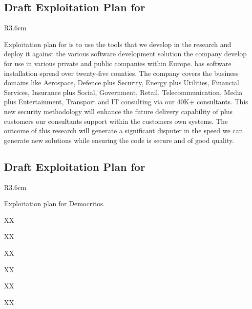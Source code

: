 \documentclass[a4paper,11pt]{article}
\begin{document}
\subsection*{Draft Exploitation Plan for \SOPRAshort{}}
\vspace{-6pt}

\begin{wrapfigure}{R}{3.6cm}
\vspace{-1.3cm}
\hfill {}
\vspace{-0.8cm}
\end{wrapfigure}

Exploitation plan for \SOPRAlong{} is to use the tools that we develop in the research and deploy it against the various software development solution the company develop for use in various private and public companies within Europe. \SOPRAshort{} has software installation spread over twenty-five counties. The company covers the business domains like Aerospace, Defence plus Security, Energy plus Utilities, Financial Services, Insurance plus Social, Government, Retail, Telecommunication, Media plus Entertainment, Transport and IT consulting via our 40K+ consultants. This new security methodology will enhance the future delivery capability of \SOPRAshort{} plus customers our consultants support within the customers own systems. The outcome of this research will generate a significant disputer in the speed we can generate new solutions while ensuring the code is secure and of good quality.

\horizontalline

\subsection*{Draft Exploitation Plan for \DEMshort{}}
\vspace{-6pt}

\begin{wrapfigure}{R}{3.6cm}
\vspace{-1.3cm}
\hfill {}
\vspace{-0.8cm}
\end{wrapfigure}

Exploitation plan for Democritos.

XX

XX

XX

XX

XX

XX
\end{document}

